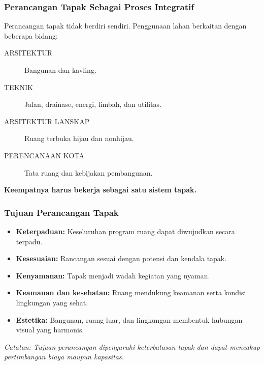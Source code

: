 \documentclass[../main.tex]{subfiles}
\begin{document}
\begin{frame}[mytitle=center, c, mycolor=digiPH_ocean, dark]
	\frametitle{Perancangan Tapak Sebagai Proses Integratif}

	Perancangan tapak tidak berdiri sendiri. Penggunaan lahan berkaitan dengan beberapa bidang:

	\begin{description}
		\item[ARSITEKTUR] Bangunan dan kavling.
		\item[TEKNIK] Jalan, drainase, energi, limbah, dan utilitas.
		\item[ARSITEKTUR LANSKAP] Ruang terbuka hijau dan nonhijau.
		\item[PERENCANAAN KOTA] Tata ruang dan kebijakan pembangunan.
	\end{description}

	\vspace{0.5cm}
	\textbf{Keempatnya harus bekerja sebagai satu sistem tapak.}
\end{frame}

\begin{frame}[mytitle=standard, t, mycolor=digiPH_white, light]
	\frametitle{Tujuan Perancangan Tapak}

	\begin{itemize}
		\item \textbf{Keterpaduan:} Keseluruhan program ruang dapat diwujudkan secara terpadu.
		\item \textbf{Kesesuaian:} Rancangan sesuai dengan potensi dan kendala tapak.
		\item \textbf{Kenyamanan:} Tapak menjadi wadah kegiatan yang nyaman.
		\item \textbf{Keamanan dan kesehatan:} Ruang mendukung keamanan serta kondisi lingkungan yang sehat.
		\item \textbf{Estetika:} Bangunan, ruang luar, dan lingkungan membentuk hubungan visual yang harmonis.
	\end{itemize}

	\vspace{0.3cm}
	\textit{Catatan: Tujuan perancangan dipengaruhi keterbatasan tapak dan dapat mencakup pertimbangan biaya maupun kapasitas.}
\end{frame}
\end{document}
